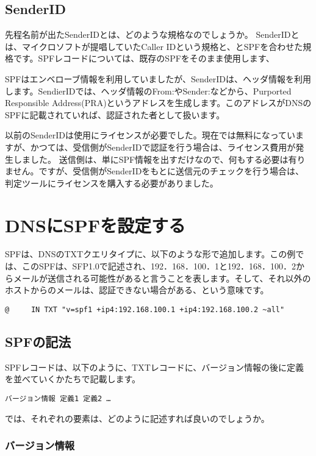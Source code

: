\subsection{SenderID}

先程名前が出たSenderIDとは、どのような規格なのでしょうか。
SenderIDとは、マイクロソフトが提唱していたCaller IDという規格と、とSPFを合わせた規格です。SPFレコードについては、既存のSPFをそのまま使用します、

SPFはエンベローブ情報を利用していましたが、SenderIDは、ヘッダ情報を利用します。SendierIDでは、ヘッダ情報のFrom:やSender:などから、Purported Responsible Address(PRA)というアドレスを生成します。このアドレスがDNSのSPFに記載されていれば、認証された者として扱います。

以前のSenderIDは使用にライセンスが必要でした。現在では無料になっていますが、かつては、受信側がSenderIDで認証を行う場合は、ライセンス費用が発生しました。
送信側は、単にSPF情報を出すだけなので、何もする必要は有りません。ですが、受信側がSenderIDをもとに送信元のチェックを行う場合は、判定ツールにライセンスを購入する必要がありました。

\section{DNSにSPFを設定する}

SPFは、DNSのTXTクエリタイプに、以下のような形で追加します。この例では、このSPFは、SFP1.0で記述され、192．168．100．1と192．168．100．2からメールが送信される可能性があると言うことを表します。そして、それ以外のホストからのメールは、認証できない場合がある、という意味です。

\begin{verbatim}
@     IN TXT "v=spf1 +ip4:192.168.100.1 +ip4:192.168.100.2 ~all"
\end{verbatim}

\subsection{SPFの記法}

SPFレコードは、以下のように、TXTレコードに、バージョン情報の後に定義を並べていくかたちで記載します。

\begin{verbatim}
バージョン情報 定義1 定義2 …
\end{verbatim}

では、それぞれの要素は、どのように記述すれば良いのでしょうか。

\subsubsection{バージョン情報}

